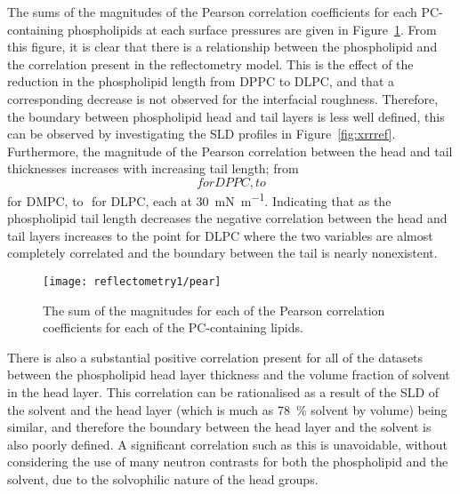 The sums of the magnitudes of the Pearson correlation coefficients for each PC-containing phospholipids at each surface pressures are given in Figure~\ref{fig:pear}.
From this figure, it is clear that there is a relationship between the phospholipid and the correlation present in the reflectometry model.
This is the effect of the reduction in the phospholipid length from DPPC to DLPC, and that a corresponding decrease is not observed for the interfacial roughness.
Therefore, the boundary between phospholipid head and tail layers is less well defined, this can be observed by investigating the SLD profiles in Figure~\ref{fig:xrrref}.
Furthermore, the magnitude of the Pearson correlation between the head and tail thicknesses increases with increasing tail length; from $$ for DPPC, to $$ for DMPC, to $$ for DLPC, each at \SI{30}{\milli\newton\per\meter}.
Indicating that as the phospholipid tail length decreases the negative correlation between the head and tail layers increases to the point for DLPC where the two variables are almost completely correlated and the boundary between the tail is nearly nonexistent.
%
\begin{figure}
    \centering
    \texttt{[image: reflectometry1/pear]}
    \caption{The sum of the magnitudes for each of the Pearson correlation coefficients for each of the PC-containing lipids.}
    \label{fig:pear}
\end{figure}
%

There is also a substantial positive correlation present for all of the datasets between the phospholipid head layer thickness and the volume fraction of solvent in the head layer.
This correlation can be rationalised as a result of the SLD of the solvent and the head layer (which is much as \SI{78}{\percent} solvent by volume) being similar, and therefore the boundary between the head layer and the solvent is also poorly defined.
A significant correlation such as this is unavoidable, without considering the use of many neutron contrasts for both the phospholipid and the solvent, due to the solvophilic nature of the head groups.
